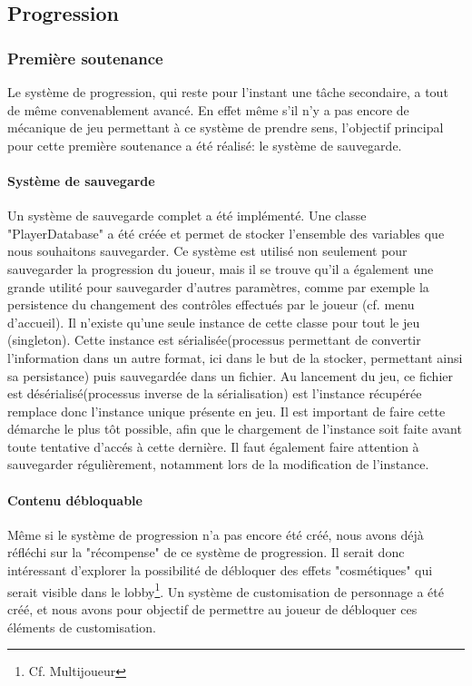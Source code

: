 \subsection{Progression}

    \subsubsection{Première soutenance}

        Le système de progression, qui reste pour l'instant une tâche secondaire, a tout de même convenablement avancé. En effet même s'il n'y a pas 
        encore de mécanique de jeu permettant à ce système de prendre sens, l'objectif principal pour cette première soutenance a été réalisé: le système 
        de sauvegarde.
        

        \paragraph{Système de sauvegarde}
        Un système de sauvegarde complet a été implémenté. Une classe "PlayerDatabase" a été créée et permet de stocker l'ensemble des variables que nous 
        souhaitons sauvegarder. Ce système est utilisé non seulement pour sauvegarder la progression du joueur, mais il se trouve qu'il a également une grande 
        utilité pour sauvegarder d'autres paramètres, comme par exemple la persistence du changement des contrôles effectués par le joueur (cf. menu d'accueil). 
        Il n'existe qu'une seule instance de cette classe pour tout le jeu (singleton). Cette instance est sérialisée(processus permettant de convertir 
        l'information dans un autre format, ici dans le but de la stocker, permettant ainsi sa persistance) puis sauvegardée dans un fichier. Au lancement du 
        jeu, ce fichier est désérialisé(processus inverse de la sérialisation) est l'instance récupérée remplace donc l'instance unique présente en jeu. Il est 
        important de faire cette démarche le plus tôt possible, afin que le chargement de l'instance soit faite avant toute tentative d'accés à cette dernière. 
        Il faut également faire attention à sauvegarder régulièrement, notamment lors de la modification de l'instance.


        \paragraph{Contenu débloquable}
        Même si le système de progression n'a pas encore été créé, nous avons déjà réfléchi sur la "récompense" de ce système de progression. Il serait donc 
        intéressant d'explorer la possibilité de débloquer des effets "cosmétiques" qui serait visible dans le lobby\footnote{Cf. Multijoueur}. Un système de 
        customisation de personnage a été créé, et nous avons pour objectif de permettre au joueur de débloquer ces éléments de customisation.


